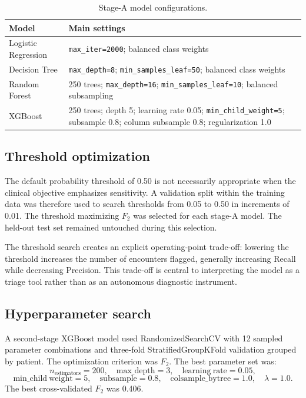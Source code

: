 \documentclass[10pt,a4paper]{article}
\begin{document}
\begin{table}[H]
\centering
\caption{Stage-A model configurations.}
\label{tab:models}
\begin{tabularx}{\textwidth}{lY}
\toprule
Model & Main settings\\
\midrule
Logistic Regression & \texttt{max\_iter=2000}; balanced class weights\\
Decision Tree & \texttt{max\_depth=8}; \texttt{min\_samples\_leaf=50}; balanced class weights\\
Random Forest & 250 trees; \texttt{max\_depth=16}; \texttt{min\_samples\_leaf=10}; balanced subsampling\\
XGBoost & 250 trees; depth 5; learning rate 0.05; \texttt{min\_child\_weight=5}; subsample 0.8; column subsample 0.8; regularization 1.0\\
\bottomrule
\end{tabularx}
\end{table}

\subsection{Threshold optimization}

The default probability threshold of 0.50 is not necessarily appropriate when the clinical objective emphasizes sensitivity. A validation split within the training data was therefore used to search thresholds from 0.05 to 0.50 in increments of 0.01. The threshold maximizing $F_2$ was selected for each stage-A model. The held-out test set remained untouched during this selection.

The threshold search creates an explicit operating-point trade-off: lowering the threshold increases the number of encounters flagged, generally increasing Recall while decreasing Precision. This trade-off is central to interpreting the model as a triage tool rather than as an autonomous diagnostic instrument.

\subsection{Hyperparameter search}

A second-stage XGBoost model used RandomizedSearchCV with 12 sampled parameter combinations and three-fold StratifiedGroupKFold validation grouped by patient. The optimization criterion was $F_2$. The best parameter set was:
\[
n_{\mathrm{estimators}}=200,\quad
\mathrm{max\_depth}=3,\quad
\mathrm{learning\ rate}=0.05,
\]
\[
\mathrm{min\_child\ weight}=5,\quad
\mathrm{subsample}=0.8,\quad
\mathrm{colsample\_bytree}=1.0,\quad
\lambda=1.0.
\]
The best cross-validated $F_2$ was 0.406.
\end{document}
